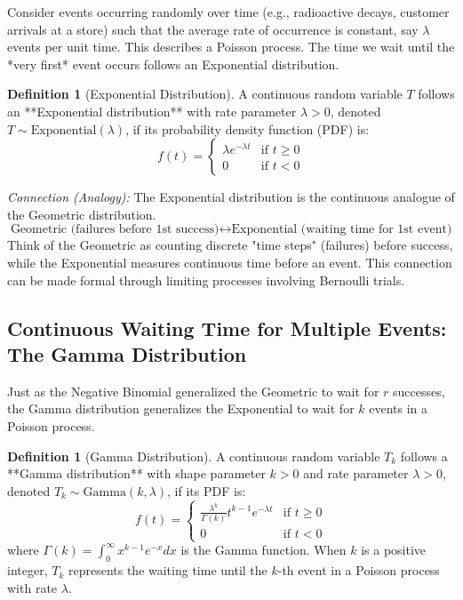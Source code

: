 \documentclass[11pt, letterpaper]{article}
\theoremstyle{definition}
\newtheorem{definition}[theorem]{Definition}
\theoremstyle{remark}
\begin{document}
Consider events occurring randomly over time (e.g., radioactive decays, customer arrivals at a store) such that the average rate of occurrence is constant, say $\lambda$ events per unit time. This describes a Poisson process. The time we wait until the *very first* event occurs follows an Exponential distribution.

\begin{definition}[Exponential Distribution]
A continuous random variable $T$ follows an **Exponential distribution** with rate parameter $\lambda > 0$, denoted $T \sim \text{Exponential}(\lambda)$, if its probability density function (PDF) is:
$$ f(t) = \begin{cases} \lambda e^{-\lambda t} & \text{if } t \ge 0 \\ 0 & \text{if } t < 0 \end{cases} $$
\end{definition}

\textit{Connection (Analogy):} The Exponential distribution is the continuous analogue of the Geometric distribution.
$$ \text{Geometric (failures before 1st success)} \longleftrightarrow \text{Exponential (waiting time for 1st event)} $$
Think of the Geometric as counting discrete "time steps" (failures) before success, while the Exponential measures continuous time before an event. This connection can be made formal through limiting processes involving Bernoulli trials.

\subsection{Continuous Waiting Time for Multiple Events: The Gamma Distribution}

Just as the Negative Binomial generalized the Geometric to wait for $r$ successes, the Gamma distribution generalizes the Exponential to wait for $k$ events in a Poisson process.

\begin{definition}[Gamma Distribution]
A continuous random variable $T_k$ follows a **Gamma distribution** with shape parameter $k > 0$ and rate parameter $\lambda > 0$, denoted $T_k \sim \text{Gamma}(k, \lambda)$, if its PDF is:
$$ f(t) = \begin{cases} \frac{\lambda^k}{\Gamma(k)} t^{k-1} e^{-\lambda t} & \text{if } t \ge 0 \\ 0 & \text{if } t < 0 \end{cases} $$
where $\Gamma(k) = \int_0^\infty x^{k-1} e^{-x} dx$ is the Gamma function. When $k$ is a positive integer, $T_k$ represents the waiting time until the $k$-th event in a Poisson process with rate $\lambda$.
\end{definition}
\end{document}
